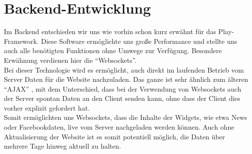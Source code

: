 \documentclass[10pt,a4paper]{report}
\begin{document}
\section{Backend-Entwicklung}
	Im Backend entschieden wir uns wie vorhin schon kurz erwähnt für das Play-Framework. Diese Software ermöglichte uns große Performance und stellte uns auch alle benötigten Funktionen ohne Umwege zur Verfügung. Besondere Erwähnung verdienen hier die "`Websockets"'.\\
	Bei dieser Technologie wird es ermöglicht, auch direkt im laufenden Betrieb vom Server Daten für die Website nachzuladen. Das ganze ist sehr ähnlich zum älteren "`AJAX"' , mit dem Unterschied, dass bei der Verwendung von Websockets auch der Server spontan Daten an den Client senden kann, ohne dass der Client dies vorher explizit gefordert hat.\\
	Somit ermöglichten uns Websockets, dass die Inhalte der Widgets, wie etwa News oder Facebookdaten, live vom Server nachgeladen werden können. Auch ohne Aktualisierung der Website ist es somit potentiell möglich, die Daten über mehrere Tage hinweg aktuell zu halten.
\end{document}
